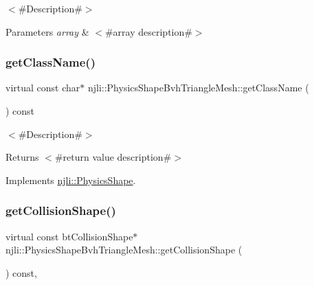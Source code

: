 $<$\#\+Description\#$>$


\begin{DoxyParams}{Parameters}
{\em array} & $<$\#array description\#$>$ \\
\hline
\end{DoxyParams}
\mbox{\label{classnjli_1_1_physics_shape_bvh_triangle_mesh_ae178ec3b2606f34fd8a5a659be3f202a}} 
\subsubsection{\texorpdfstring{get\+Class\+Name()}{getClassName()}}
{\footnotesize\ttfamily virtual const char$\ast$ njli\+::\+Physics\+Shape\+Bvh\+Triangle\+Mesh\+::get\+Class\+Name (\begin{DoxyParamCaption}{ }\end{DoxyParamCaption}) const\hspace{0.3cm}{\ttfamily [virtual]}}

$<$\#\+Description\#$>$

\begin{DoxyReturn}{Returns}
$<$\#return value description\#$>$ 
\end{DoxyReturn}


Implements \mbox{\hyperlink{classnjli_1_1_physics_shape_a72cb98a55614a3e264b8e4a157b45c64}{njli\+::\+Physics\+Shape}}.

\mbox{\label{classnjli_1_1_physics_shape_bvh_triangle_mesh_a8e2e34bd218b74d7f03c0bdcdf142901}} 
\subsubsection{\texorpdfstring{get\+Collision\+Shape()}{getCollisionShape()}\hspace{0.1cm}{\footnotesize\ttfamily [1/2]}}
{\footnotesize\ttfamily virtual const bt\+Collision\+Shape$\ast$ njli\+::\+Physics\+Shape\+Bvh\+Triangle\+Mesh\+::get\+Collision\+Shape (\begin{DoxyParamCaption}{ }\end{DoxyParamCaption}) const\hspace{0.3cm}{\ttfamily [protected]}, {\ttfamily [virtual]}}



